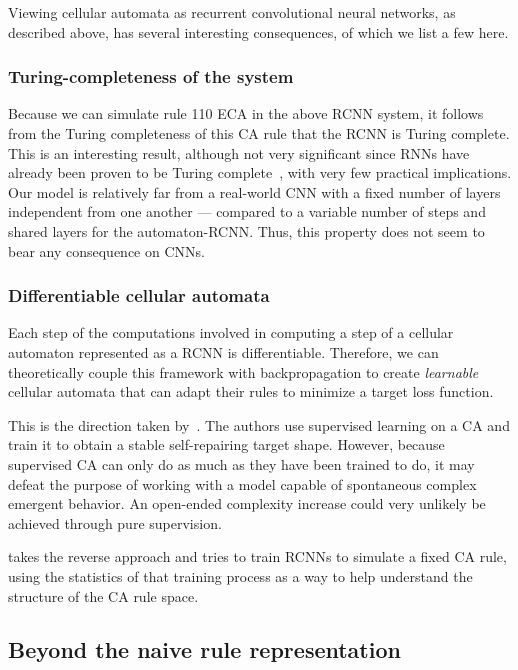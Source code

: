 Viewing cellular automata as recurrent convolutional neural networks, as described above, has several interesting consequences, of which we list a few
here.

\subsubsection{Turing-completeness of the system}

Because we can simulate rule 110 ECA in the above RCNN system, it follows from
the Turing completeness of this CA rule that the RCNN is Turing complete. This
is an interesting result, although not very significant since \acp{RNN} have
already been proven to be Turing
complete~\parencite{siegelmannComputationalPowerNeural1992}, with very few
practical implications. Our model is relatively far from a real-world CNN with a
fixed number of layers independent from one another --- compared to a variable
number of steps and shared layers for the automaton-RCNN. Thus, this property
does not seem to bear any consequence on \acp{CNN}.

\subsubsection{Differentiable cellular automata}

Each step of the computations involved in computing a step of a cellular
automaton represented as a RCNN is differentiable. Therefore, we can
theoretically couple this framework with backpropagation to create
\emph{learnable} cellular automata that can adapt their rules to minimize a
target loss function.

This is the direction taken by~\textcite{mordvintsevGrowingNeuralCellular2020}.
The authors use supervised learning on a \ac{CA} and train it to obtain a stable
self-repairing target shape. However, because supervised \ac{CA} can only do as
much as they have been trained to do, it may defeat the purpose of working with
a model capable of spontaneous complex emergent behavior. An open-ended
complexity increase could very unlikely be achieved through pure supervision.

\textcite{gilpinCellularAutomataConvolutional2018} takes the reverse approach
and tries to train RCNNs to simulate a fixed \ac{CA} rule, using the statistics
of that training process as a way to help understand the structure of the
\ac{CA} rule space.

\subsection{Beyond the naive rule representation}

